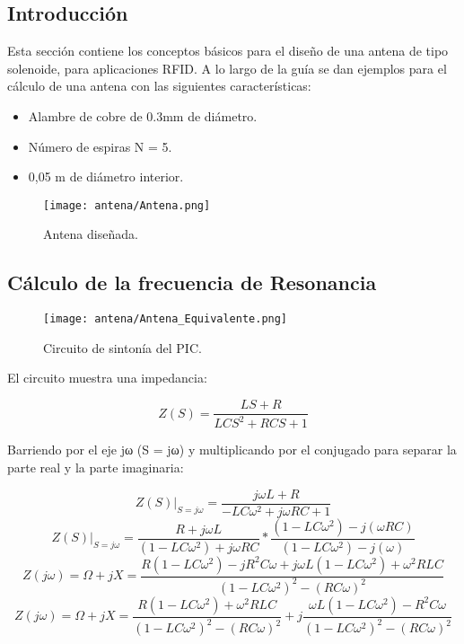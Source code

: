 \subsection{Introducción}
Esta sección contiene los conceptos básicos para el diseño de una antena de tipo solenoide,
para aplicaciones RFID.
A lo largo de la guía se dan ejemplos para el cálculo de una antena con las siguientes
características:
\begin{itemize}
\item Alambre de cobre de 0.3mm de diámetro.
\item Número de espiras N = 5.
\item 0,05 m de diámetro interior.
\end{itemize}

\begin{figure}[H]
\centering
\texttt{[image: antena/Antena.png]}
\caption{Antena diseñada.}
\label{fig:antena}
\end{figure}

\subsection{Cálculo de la frecuencia de Resonancia}

\begin{figure}[H]
\centering
\texttt{[image: antena/Antena\_Equivalente.png]}
\caption{Circuito de sintonía del PIC.}
\label{fig:antena_eq}
\end{figure}

El circuito muestra una impedancia:

\begin{equation}
Z(S) = \frac{LS + R}{LCS^2 + RCS + 1}
\end{equation}

Barriendo por el eje jω (S = jω) y multiplicando por el conjugado para separar la parte real
y la parte imaginaria:

$$Z(S)|_{S=j\omega} = \frac{j\omega L + R}{-LC\omega ^2 + j\omega RC + 1}$$
$$Z(S)|_{S=j\omega} = \frac{R + j\omega L}{(1 - LC\omega^2) + j\omega RC} * \frac{(1 - LC\omega ^2) - j(\omega RC)}{(1 - LC\omega ^2) - j(\omega)}$$
$$Z(j\omega) = \Omega + jX = \frac{R(1 - LC\omega ^2)-jR^2C\omega+j\omega L(1-LC\omega ^2)+\omega ^2 RLC}{(1 - LC\omega ^2)^2 - (RC\omega )^2}$$
$$Z(j\omega) = \Omega + jX = \frac{R(1 - LC\omega ^2)+\omega ^2RLC}{(1 - LC\omega ^2)^2 - (RC\omega )^2}+j\frac{\omega L(1 - LC\omega ^2)-R^2C\omega}{(1 - LC\omega ^2)^2 - (RC\omega )^2}$$

